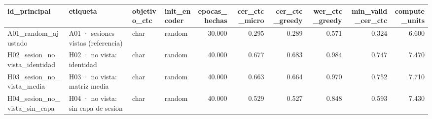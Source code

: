 \begin{tabular}{llllrrrrrr}
\toprule
id_principal & etiqueta & objetivo_ctc & init_encoder & epocas_hechas & cer_ctc_micro & cer_ctc_greedy & wer_ctc_greedy & min_valid_cer_ctc & compute_units \\
\midrule
A01_random_ajustado & A01 · sesiones vistas (referencia) & char & random & 30.000 & 0.295 & 0.289 & 0.571 & 0.324 & 6.600 \\
H02_sesion_no_vista_identidad & H02 · no vista: identidad & char & random & 40.000 & 0.677 & 0.683 & 0.984 & 0.747 & 7.470 \\
H03_sesion_no_vista_media & H03 · no vista: matriz media & char & random & 40.000 & 0.663 & 0.664 & 0.970 & 0.752 & 7.710 \\
H04_sesion_no_vista_sin_capa & H04 · no vista: sin capa de sesion & char & random & 40.000 & 0.529 & 0.527 & 0.848 & 0.593 & 7.430 \\
\bottomrule
\end{tabular}
